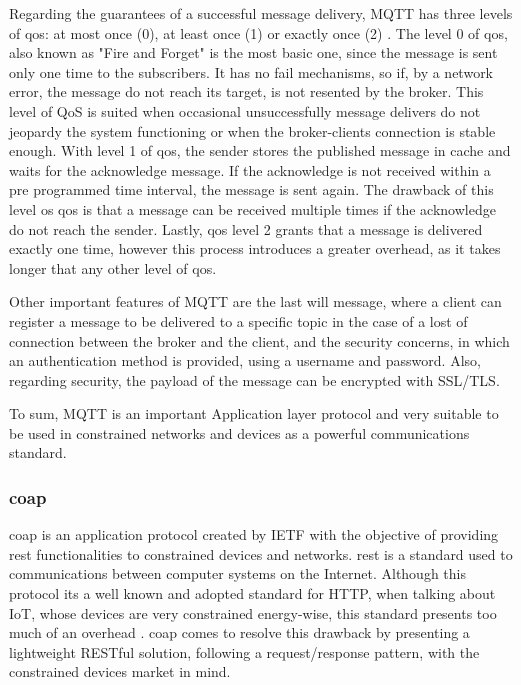Regarding the guarantees of a successful message delivery, MQTT has three levels of \acf{qos}: at most once (0), at least once (1) or exactly once (2) \cite{mqtt_qos}. The level 0 of \ac{qos}, also known as "Fire and Forget" is the most basic one, since the message is sent only one time to the subscribers. It has no fail mechanisms, so if, by a network error, the message do not reach its target, is not resented by the broker. This level of QoS is suited when occasional unsuccessfully message delivers do not jeopardy the system functioning or when the broker-clients connection is stable enough. With level 1 of \ac{qos}, the sender stores the published message in cache and waits for the acknowledge message. If the acknowledge is not received within a pre programmed time interval, the message is sent again. The drawback of this level os \ac{qos} is that a message can be received multiple times if the acknowledge do not reach the sender. Lastly, \ac{qos} level 2 grants that a message is delivered exactly one time, however this process introduces a greater overhead, as it takes longer that any other level of \ac{qos}.

Other important features of MQTT are the last will message, where a client can register a message to be delivered to a specific topic in the case of a lost of connection between the broker and the client, and the security concerns, in which an authentication method is provided, using a username and password. Also, regarding security, the payload of the message can be encrypted with SSL/TLS.

To sum, MQTT is an important Application layer protocol and very suitable to be used in constrained networks and devices as a powerful communications standard.

\subsubsection{\acf{coap}}

\acf{coap} is an application protocol created by IETF with the objective of providing \acf{rest} functionalities to constrained devices and networks. \ac{rest} is a standard used to communications between computer systems on the Internet. Although this protocol its a well known and adopted standard for HTTP, when talking about IoT, whose devices are very constrained energy-wise, this standard presents too much of an overhead \cite{Salman2013}. \ac{coap} comes to resolve this drawback by presenting a lightweight RESTful solution, following a request/response pattern, with the constrained devices market in mind.

